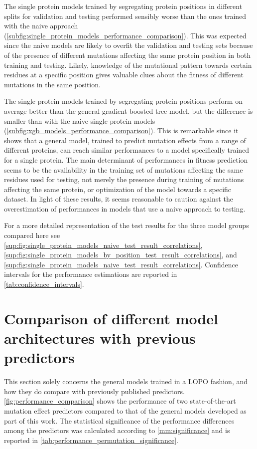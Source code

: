 The single protein models trained by segregating protein positions in different splits for validation and testing performed sensibly worse than the ones trained with the naive approach (\autoref{subfig:single_protein_models_performance_comparison}).
This was expected since the naive models are likely to overfit the validation and testing sets because of the presence of different mutations affecting the same protein position in both training and testing.
Likely, knowledge of the mutational pattern towards certain residues at a specific position gives valuable clues about the fitness of different mutations in the same position.

The single protein models trained by segregating protein positions perform on average better than the general gradient boosted tree model, but the difference is smaller than with the naive single protein models (\autoref{subfig:xgb_models_performance_comparison}).
This is remarkable since it shows that a general model, trained to predict mutation effects from a range of different proteins, can reach similar performances to a model specifically trained for a single protein.
The main determinant of performances in fitness prediction seems to be the availability in the training set of mutations affecting the same residues used for testing, not merely the presence during training of mutations affecting the same protein, or optimization of the model towards a specific dataset.
In light of these results, it seems reasonable to caution against the overestimation of performances in models that use a naive approach to testing.

For a more detailed representation of the test results for the three model groups compared here see \autoref{sup:fig:single_protein_models_naive_test_result_correlations}, \autoref{sup:fig:single_protein_models_by_position_test_result_correlations}, and \autoref{sup:fig:single_protein_models_naive_test_result_correlations}.
Confidence intervals for the performance estimations are reported in \autoref{tab:confidence_intervals}.

\section{Comparison of different model architectures with previous predictors}
This section solely concerns the general models trained in a LOPO fashion, and how they do compare with previously published predictors.
\autoref{fig:performance_comparison} shows the performance of two state-of-the-art mutation effect predictors compared to that of the general models developed as part of this work.
The statistical significance of the performance differences among the predictors was calculated according to \autoref{mm:significance} and is reported in \autoref{tab:performance_permutation_significance}.


